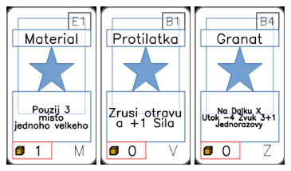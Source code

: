 \documentclass[a4paper]{article}
\begin{document}
	\includegraphics[width=3.0cm]{img-1_50}
	\includegraphics[width=3.0cm]{img-1_65}
	\includegraphics[width=3.0cm]{img-1_98}
\end{document}

